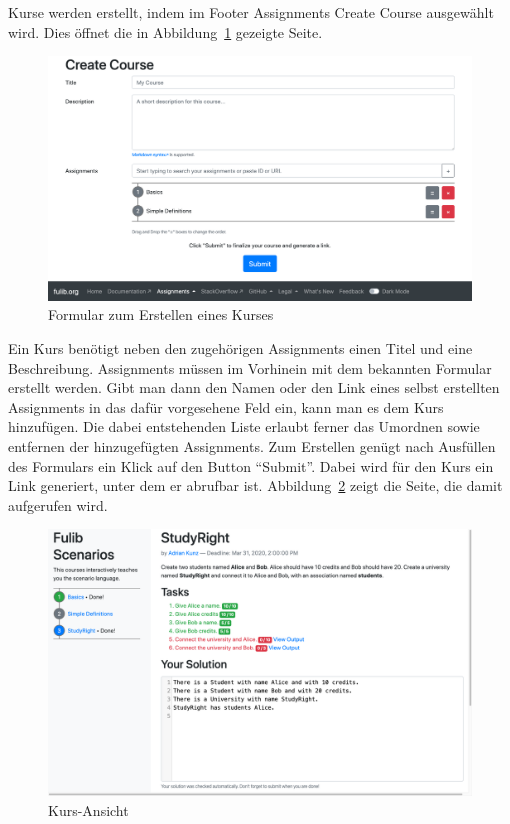 Kurse werden erstellt, indem im Footer Assignments \textrightarrow Create Course ausgewählt wird.
Dies öffnet die in Abbildung~\ref{fig:create-course} gezeigte Seite.

\begin{figure}
    \centering
    \includegraphics[width=\textwidth]{chapter/fulib.org/img/create-course.png}
    \caption{Formular zum Erstellen eines Kurses}
    \label{fig:create-course}
\end{figure}

Ein Kurs benötigt neben den zugehörigen Assignments einen Titel und eine Beschreibung.
Assignments müssen im Vorhinein mit dem bekannten Formular erstellt werden.
Gibt man dann den Namen oder den Link eines selbst erstellten Assignments in das dafür vorgesehene Feld ein, kann man es dem Kurs hinzufügen.
Die dabei entstehenden Liste erlaubt ferner das Umordnen sowie entfernen der hinzugefügten Assignments.
Zum Erstellen genügt nach Ausfüllen des Formulars ein Klick auf den Button ``Submit''.
Dabei wird für den Kurs ein Link generiert, unter dem er abrufbar ist.
Abbildung~\ref{fig:course-view} zeigt die Seite, die damit aufgerufen wird.

\begin{figure}
    \centering
    \includegraphics[width=\textwidth]{chapter/fulib.org/img/course-view.png}
    \caption{Kurs-Ansicht}
    \label{fig:course-view}
\end{figure}

